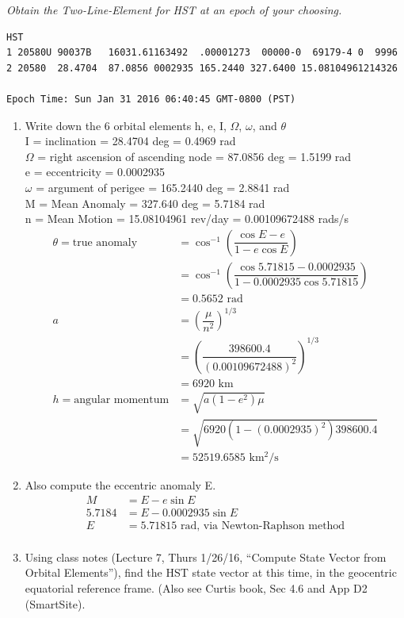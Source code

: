 \documentclass[onecolumn,10pt]{jhwhw}
\begin{document}
\clearpage
\problem{}
\textit{Obtain the Two-Line-Element for HST at an epoch of your choosing.}
\begin{verbatim}
HST
1 20580U 90037B   16031.61163492  .00001273  00000-0  69179-4 0  9996
2 20580  28.4704  87.0856 0002935 165.2440 327.6400 15.08104961214326

Epoch Time: Sun Jan 31 2016 06:40:45 GMT-0800 (PST)
\end{verbatim}
\begin{enumerate}
\item Write down the 6 orbital elements h, e, I, $\Omega$, $\omega$, and $\theta$\\
I = inclination = 28.4704 deg = 0.4969 rad\\
$\Omega$ = right ascension of ascending node = 87.0856 deg = 1.5199 rad\\
e = eccentricity = 0.0002935\\
$\omega$ = argument of perigee = 165.2440 deg = 2.8841 rad\\
M = Mean Anomaly = 327.640 deg = 5.7184 rad\\
n = Mean Motion = 15.08104961 rev/day = 0.00109672488 rads/s
\begin{align*}
\theta = \mbox{true anomaly} &= \cos^{-1}\left({\dfrac{\cos{E} - e}{1 - e \cos{E}}}\right) \\
       &= \cos^{-1}\left({\dfrac{\cos{5.71815} - 0.0002935}{1 - 0.0002935 \cos{5.71815}}}\right) \\
       &= 0.5652 \mbox{ rad}\\
a &= \left(\dfrac{\mu}{n^2}\right)^{1/3} \\
  &= \left(\dfrac{398600.4}{(0.00109672488)^2}\right)^{1/3} \\
  &= 6920 \mbox{ km}\\
h = \mbox{angular momentum} &= \sqrt{a(1-e^2)\mu} \\
  &= \sqrt{6920 (1-(0.0002935)^2) 398600.4} \\
  &= 52519.6585 \mbox{ km$^2$/s}
\end{align*}

\item Also compute the eccentric anomaly E.
\begin{align*}
M &= E - e \sin{E} \\
5.7184 &= E - 0.0002935 \sin{E} \\
E &= 5.71815 \mbox{ rad, via Newton-Raphson method} \\
\end{align*}
\item Using class notes (Lecture 7, Thurs 1/26/16, ``Compute State Vector from Orbital Elements''), find the HST state vector at this time, in the geocentric equatorial reference frame. (Also see Curtis book, Sec 4.6 and App D2 (SmartSite).

\end{enumerate}
\end{document}
